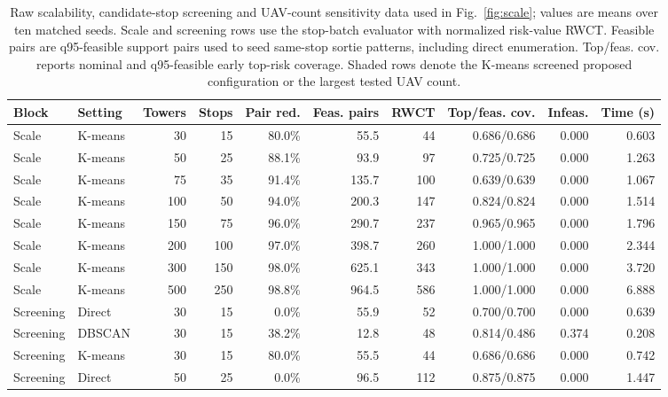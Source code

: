\begin{table}[H]
\centering
\caption{Raw scalability, candidate-stop screening and UAV-count sensitivity data used in Fig.~\ref{fig:scale}; values are means over ten matched seeds. Scale and screening rows use the stop-batch evaluator with normalized risk-value RWCT. Feasible pairs are q95-feasible support pairs used to seed same-stop sortie patterns, including direct enumeration. Top/feas. cov. reports nominal and q95-feasible early top-risk coverage. Shaded rows denote the K-means screened proposed configuration or the largest tested UAV count.}
\label{tab:scalability-screening}
\small
\setlength{\tabcolsep}{2.7pt}
\begin{tabularx}{\textwidth}{@{}>{\raggedright\arraybackslash}p{}>{\raggedright\arraybackslash}Xrrrrrrrr@{}}
\toprule
Block & Setting & Towers & Stops & Pair red. & Feas. pairs & RWCT & Top/feas. cov. & Infeas. & Time (s) \\
\midrule
\rowcolor{gray!10}
Scale & K-means & 30 & 15 & 80.0\% & 55.5 & 44 & 0.686/0.686 & 0.000 & 0.603 \\
\rowcolor{gray!10}
Scale & K-means & 50 & 25 & 88.1\% & 93.9 & 97 & 0.725/0.725 & 0.000 & 1.263 \\
\rowcolor{gray!10}
Scale & K-means & 75 & 35 & 91.4\% & 135.7 & 100 & 0.639/0.639 & 0.000 & 1.067 \\
\rowcolor{gray!10}
Scale & K-means & 100 & 50 & 94.0\% & 200.3 & 147 & 0.824/0.824 & 0.000 & 1.514 \\
\rowcolor{gray!10}
Scale & K-means & 150 & 75 & 96.0\% & 290.7 & 237 & 0.965/0.965 & 0.000 & 1.796 \\
\rowcolor{gray!10}
Scale & K-means & 200 & 100 & 97.0\% & 398.7 & 260 & 1.000/1.000 & 0.000 & 2.344 \\
\rowcolor{gray!10}
Scale & K-means & 300 & 150 & 98.0\% & 625.1 & 343 & 1.000/1.000 & 0.000 & 3.720 \\
\rowcolor{gray!10}
Scale & K-means & 500 & 250 & 98.8\% & 964.5 & 586 & 1.000/1.000 & 0.000 & 6.888 \\
\addlinespace[2pt]
Screening & Direct & 30 & 15 & 0.0\% & 55.9 & 52 & 0.700/0.700 & 0.000 & 0.639 \\
Screening & DBSCAN & 30 & 15 & 38.2\% & 12.8 & 48 & 0.814/0.486 & 0.374 & 0.208 \\
\rowcolor{gray!10}
Screening & K-means & 30 & 15 & 80.0\% & 55.5 & 44 & 0.686/0.686 & 0.000 & 0.742 \\
Screening & Direct & 50 & 25 & 0.0\% & 96.5 & 112 & 0.875/0.875 & 0.000 & 1.447 \\

\end{tabularx}
\end{table}

